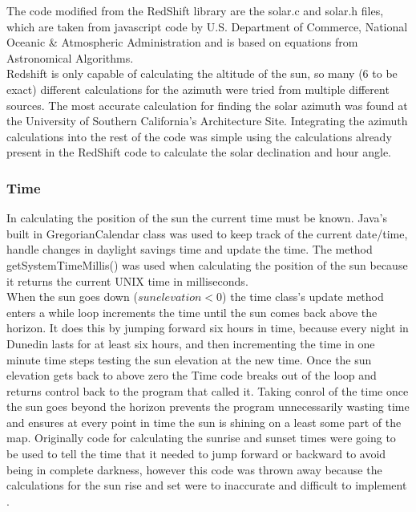 \documentclass[12pt]{report}
\begin{document}
The code modified from the RedShift library are the solar.c and solar.h files, which are taken from javascript code by U.S. Department of Commerce, National Oceanic \& Atmospheric Administration\cite{usnoaa} and is based on equations from Astronomical Algorithms\cite{astronomicalalgorithms}. \\

Redshift is only capable of calculating the altitude of the sun, so many (6 to be exact) different calculations for the azimuth were tried from multiple different sources. The most accurate calculation for finding the solar azimuth was found at the University of Southern California's Architecture Site\cite{solarazi}. Integrating the azimuth calculations into the rest of the code was simple using the calculations already present in the RedShift code to calculate the solar declination and hour angle.\\

\subsubsection{Time}
In calculating the position of the sun the current time must be known. Java's built in GregorianCalendar class was used to keep track of the current date/time, handle changes in daylight savings time and update the time. The method getSystemTimeMillis() was used when calculating the position of the sun because it returns the current UNIX time in milliseconds.\\

When the sun goes down ($sun elevation < 0$) the time class's update method enters a while loop increments the time until the sun comes back above the horizon. It does this by jumping forward six  hours in time, because every night in Dunedin lasts for at least six hours, and then incrementing the time in one minute time steps testing the sun elevation at the new time. Once the sun elevation gets back to above zero the Time code breaks out of the loop and returns control back to the program that called it. Taking conrol of the time once the sun goes beyond the horizon prevents the program unnecessarily wasting time and ensures at every point in time the sun is shining on a least some part of the map. Originally code for calculating the sunrise and sunset times were going to be used to tell the time that it needed to jump forward or backward to avoid being in complete darkness, however this code was thrown away because the calculations for the sun rise and set were to inaccurate and difficult to implement .\\%
\end{document}
